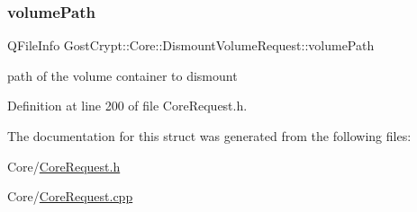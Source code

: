 \subsubsection{\texorpdfstring{volume\+Path}{volumePath}}
{\footnotesize\ttfamily Q\+File\+Info Gost\+Crypt\+::\+Core\+::\+Dismount\+Volume\+Request\+::volume\+Path}

path of the volume container to dismount 

Definition at line 200 of file Core\+Request.\+h.



The documentation for this struct was generated from the following files\+:\begin{DoxyCompactItemize}
\item 
Core/\hyperlink{_core_request_8h}{Core\+Request.\+h}\item 
Core/\hyperlink{_core_request_8cpp}{Core\+Request.\+cpp}\end{DoxyCompactItemize}
